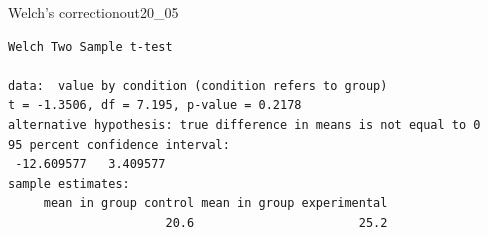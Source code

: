 \begin{Rscreen}{Welch's correction}{out20_05}
	\begin{verbatim}
Welch Two Sample t-test

data:  value by condition (condition refers to group)
t = -1.3506, df = 7.195, p-value = 0.2178
alternative hypothesis: true difference in means is not equal to 0
95 percent confidence interval:
 -12.609577   3.409577
sample estimates:
     mean in group control mean in group experimental 
                      20.6                       25.2 
\end{verbatim}
\end{Rscreen}
